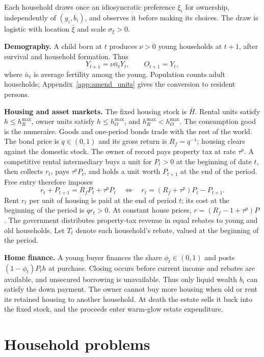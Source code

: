 \documentclass[11pt]{article}
\begin{document}
Each household draws once an idiosyncratic preference $\xi_i$ for ownership,
independently of $(y_i,b_i)$, and observes it before making its choices.
The draw is logistic with location $\bar\xi$ and scale $\sigma_\xi>0$.

\textbf{Demography.}
A child born at $t$ produces $\nu>0$ young households at $t+1$, after survival
and household formation. Thus
\begin{equation}
 Y_{t+1}=\nu\bar n_tY_t,\qquad O_{t+1}=Y_t,
 \label{eq:amend_demography}
\end{equation}
where $\bar n_t$ is average fertility among the young. Population counts adult households; Appendix~\ref{app:amend_units} gives
the conversion to resident persons.

\textbf{Housing and asset markets.}
The fixed housing stock is $\bar H$. Rental units satisfy
$h\leq h_R^{\max}$, owner units satisfy $h\leq h_O^{\max}$, and
$h_R^{\max}<h_O^{\max}$. The consumption good is the numeraire. Goods and one-period bonds trade
with the rest of the world. The bond price is $q\in(0,1)$ and its gross
return is $R_f=q^{-1}$; housing clears against the domestic stock. The owner
of record pays property tax at rate $\tau^p$. A competitive rental intermediary buys a unit for $P_t>0$ at the
beginning of date $t$, then collects $r_t$, pays $\tau^pP_t$, and holds a unit
worth $P_{t+1}$ at the end of the period. Free entry therefore imposes
\begin{equation}
 r_t+P_{t+1}=R_fP_t+\tau^pP_t
 \quad\Longleftrightarrow\quad
 r_t=(R_f+\tau^p)P_t-P_{t+1}.
 \label{eq:amend_usercost}
\end{equation}
Rent $r_t$ per unit of housing is paid at the end of period $t$; its cost
at the beginning of the period is $q r_t>0$. At constant house prices,
$r=(R_f-1+\tau^p)P$. The government distributes property-tax revenue
in equal rebates to young and old households. Let $T_t$ denote each
household's rebate, valued at the beginning of the period.

\textbf{Home finance.}
A young buyer finances the share $\phi_t\in(0,1)$ and posts
$(1-\phi_t)P_th$ at purchase. Closing occurs before current income and rebates
are available, and unsecured borrowing is unavailable. Thus only liquid
wealth $b_i$ can satisfy the down payment. The owner cannot buy more housing
when old or rent its retained housing to another household. At death the
estate sells it back into the fixed stock, and the proceeds enter warm-glow
estate expenditure.

\section{Household problems}
\end{document}

